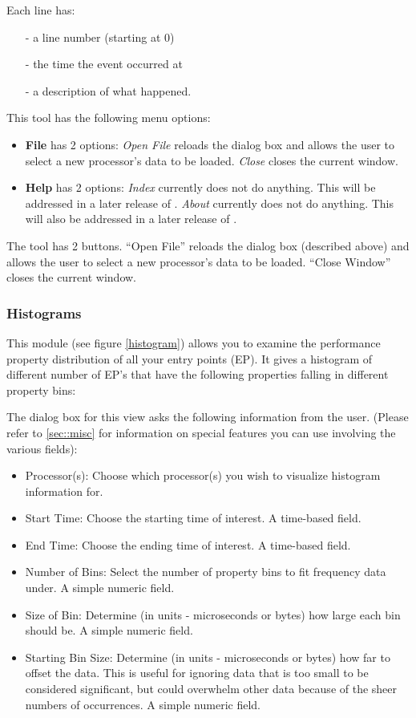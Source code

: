 \documentclass[10pt]{article}
\begin{document}
Each line has:
\begin{itemize}
\item[-] a line number (starting at 0)
\item[-] the time the event occurred at
\item[-] a description of what happened.
\end{itemize}

This tool has the following menu options:

\begin{itemize}
\item {\bf File} has 2 options: {\it Open File} reloads the dialog box
and allows the user to select a new processor's data to be loaded.
{\it Close} closes the current window.
\item {\bf Help} has 2 options: {\it Index} currently does not do anything.
This will be addressed in a later release of \projections{}. {\it About}
currently does not do anything. This will also be addressed in a later
release of \projections{}.
\end{itemize}

The tool has 2 buttons. ``Open File'' reloads the dialog box (described 
above) and allows the user to select a new processor's data to be loaded.
``Close Window'' closes the current window.

\subsubsection{Histograms}

This module (see figure \ref{histogram}) allows you to examine the
performance property distribution of all your entry points (EP). It
gives a histogram of different number of EP's that have the following
properties falling in different property bins:

The dialog box for this view asks the following information from the
user. (Please refer to \ref{sec::misc} for information on special
features you can use involving the various fields):

\begin{itemize}
\item
Processor(s): Choose which processor(s) you wish to visualize histogram
information for.
\item
Start Time: Choose the starting time of interest. A time-based field.
\item
End Time: Choose the ending time of interest. A time-based field.
\item
Number of Bins: Select the number of property bins to fit frequency data
under. A simple numeric field.
\item
Size of Bin: Determine (in units - microseconds or bytes) how large each
bin should be. A simple numeric field.
\item
Starting Bin Size: Determine (in units - microseconds or bytes) how
far to offset the data. This is useful for ignoring data that is too
small to be considered significant, but could overwhelm other data
because of the sheer numbers of occurrences. A simple numeric field.
\end{itemize}
\end{document}
